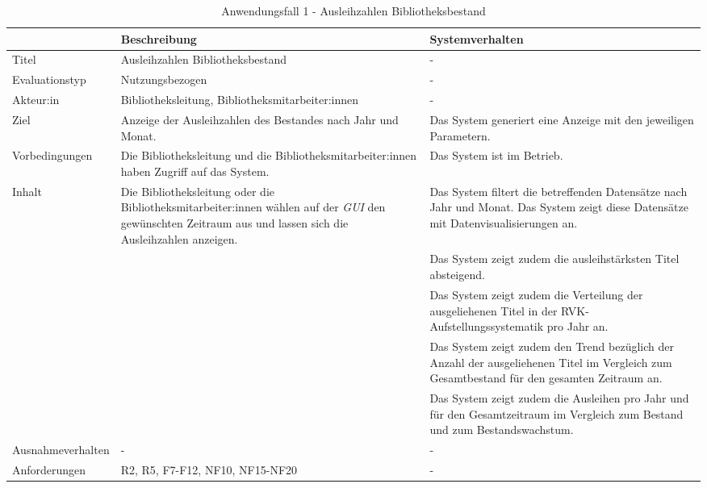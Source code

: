 \begingroup
\setlength{\tabcolsep}{10pt} %
\renewcommand{\arraystretch}{1.25} 
\begin{table}[h]
    \centering
    \begin{adjustbox}{max width=\textwidth}
    \begin{tabular}{lp{7.0cm}p{7.0cm}}
       \toprule
       \textbf{}          & \textbf{Beschreibung} &\textbf{Systemverhalten}\\
       \midrule
        Titel                            &Ausleihzahlen Bibliotheksbestand  & -\\
        Evaluationstyp                   &Nutzungsbezogen                   & -\\
        Akteur:in                        &Bibliotheksleitung, Bibliotheksmitarbeiter:innen & -\\
        Ziel                             &Anzeige der Ausleihzahlen des Bestandes nach Jahr und Monat. & Das System generiert eine Anzeige mit den jeweiligen Parametern.\\
        Vorbedingungen                   &Die Bibliotheksleitung und die Bibliotheksmitarbeiter:innen haben Zugriff auf das System. & Das System ist im Betrieb.\\
        Inhalt                           &Die Bibliotheksleitung oder die Bibliotheksmitarbeiter:innen wählen auf der \textit{\acrshort{GUI}} den gewünschten Zeitraum aus und lassen sich die Ausleihzahlen anzeigen. & Das System filtert die betreffenden Datensätze nach Jahr und Monat. Das System zeigt diese Datensätze mit Datenvisualisierungen an.\\
                                         & &Das System zeigt zudem die ausleihstärksten Titel absteigend.\\
                                         & &Das System zeigt zudem die Verteilung der ausgeliehenen Titel in der RVK-Aufstellungssystematik pro Jahr an.\\
                                         & &Das System zeigt zudem den Trend bezüglich der Anzahl der ausgeliehenen Titel im Vergleich zum Gesamtbestand für den gesamten Zeitraum an.\\
                                         & &Das System zeigt zudem die Ausleihen pro Jahr und für den Gesamtzeitraum im Vergleich zum Bestand und zum Bestandswachstum.\\
        Ausnahmeverhalten               &- &- \\
        Anforderungen                   &R2, R5, F7-F12, NF10, NF15-NF20& -\\ 
        \bottomrule
    \end{tabular}
    \end{adjustbox}
    \caption{%
    Anwendungsfall 1 - Ausleihzahlen Bibliotheksbestand
    }
    \label{tab:AF_Bibliotheksbestand}
    \end{table}
\endgroup


